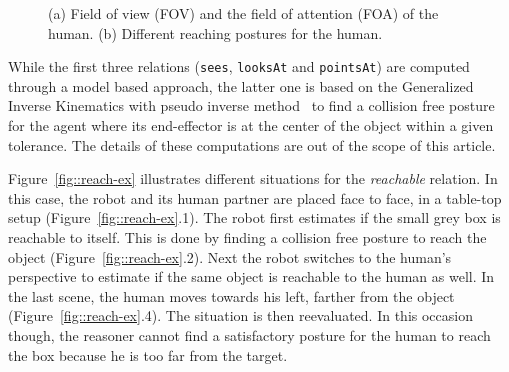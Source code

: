 \documentclass{svmult}
\newcommand{\concept}[1]{{\footnotesize \texttt{#1}}}
\begin{document}
\begin{figure}[!t]
	\begin{center}
	\caption{(a) Field of view (FOV) and the field of attention (FOA) of the human. (b) Different reaching postures for the human.}
	\label{fig::sparkRepresentations}
	\end{center}
\end{figure} 


While the first three relations (\concept{sees}, \concept{looksAt} and
\concept{pointsAt}) are computed through a model based approach, the latter one
is based on the Generalized Inverse Kinematics with pseudo inverse
method~\cite{Nakamura90,Baerlocher04} to find a collision free posture for the
agent where its end-effector is at the center of the object within a given
tolerance. The details of these computations are out of the scope of this
article.

Figure~\ref{fig::reach-ex} illustrates different situations for the
\textit{reachable} relation. In this case, the robot and its human partner
are placed face to face, in a table-top setup (Figure~\ref{fig::reach-ex}.1).
The robot first estimates if the small grey box is reachable to itself. This is
done by finding a collision free posture to reach the object
(Figure~\ref{fig::reach-ex}.2). Next the robot switches to the human's
perspective to estimate if the same object is reachable to the human as well.
In the last scene, the human moves towards his left, farther from the object
(Figure~\ref{fig::reach-ex}.4). The situation is then reevaluated. In this
occasion though, the reasoner cannot find a satisfactory posture for the human
to reach the box because he is too far from the target.
\end{document}
